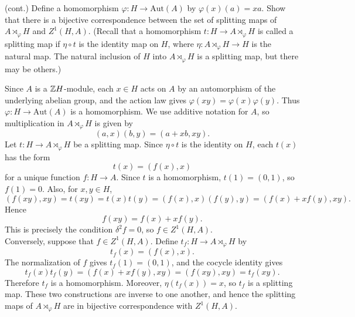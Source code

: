\documentclass[../Odyssey_Project.tex]{subfiles}
\begin{document}
\begin{exercise}
\label{ex:12.5}
(cont.) Define a homomorphism $\varphi \colon H \to \mathrm{Aut}(A)$ by $\varphi(x)(a) = xa$. Show that there is a bijective correspondence between the set of splitting maps of $A \rtimes_\varphi H$ and $Z^1(H, A)$. (Recall that a homomorphism $t \colon H \to A \rtimes_\varphi H$ is called a splitting map if $\eta \circ t$ is the identity map on $H$, where $\eta \colon A \rtimes_\varphi H \to H$ is the natural map. The natural inclusion of $H$ into $A \rtimes_\varphi H$ is a splitting map, but there may be others.)
\end{exercise}
\begin{solution}
    Since $A$ is a $\mathbb{Z} H$-module, each $x \in H$ acts on $A$ by an automorphism of the underlying abelian group, and the action law gives $\varphi(xy)=\varphi(x)\varphi(y)$. Thus $\varphi \colon H \to \mathrm{Aut}(A)$ is a homomorphism. We use additive notation for $A$, so multiplication in $A \rtimes_\varphi H$ is given by
    \[
        (a,x)(b,y) = (a + xb, xy).
    \]
    Let $t \colon H \to A \rtimes_\varphi H$ be a splitting map. Since $\eta\circ t$ is the identity on $H$, each $t(x)$ has the form
    \[
        t(x) = (f(x),x)
    \]
    for a unique function $f \colon H \to A$. Since $t$ is a homomorphism, $t(1)=(0,1)$, so $f(1)=0$. Also, for $x,y \in H$,
    \[
        (f(xy),xy)
        = t(xy)
        = t(x)t(y)
        = (f(x),x)(f(y),y)
        = (f(x)+xf(y),xy).
    \]
    Hence
    \[
        f(xy) = f(x)+xf(y).
    \]
    This is precisely the condition $\delta^2 f=0$, so $f \in Z^1(H,A)$.\\
    Conversely, suppose that $f \in Z^1(H,A)$. Define $t_f \colon H \to A \rtimes_\varphi H$ by
    \[
        t_f(x) = (f(x),x).
    \]
    The normalization of $f$ gives $t_f(1)=(0,1)$, and the cocycle identity gives
    \[
        t_f(x)t_f(y)
        = (f(x)+xf(y),xy)
        = (f(xy),xy)
        = t_f(xy).
    \]
    Therefore $t_f$ is a homomorphism. Moreover, $\eta(t_f(x))=x$, so $t_f$ is a splitting map. These two constructions are inverse to one another, and hence the splitting maps of $A \rtimes_\varphi H$ are in bijective correspondence with $Z^1(H,A)$.
\end{solution}
\end{document}
